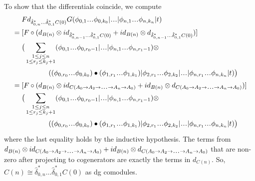 \begin{eg}
To show that the differentials coincide, 
we compute 
\begin{align*}
& \phantom{{}={}}
Fd_{\hat{\delta}_{0,n}^*\dots\hat{\delta}_{0,1}^*C(0)}G
  (\phi_{0,1} \smdots \phi_{0,k_0} | \smdots |
  \phi_{n,1} \smdots \phi_{n,k_n} | t) \\
&=
[F \circ (d_{B(n)}\otimes 
  id_{\hat{\delta}_{0,n-1}^*\dots\hat{\delta}_{0,1}^*C(0)} + 
  id_{B(n)} \otimes 
  d_{\hat{\delta}_{0,n-1}^*\dots\hat{\delta}_{0,1}^*C(0)})] \\
& \phantom{{}=  {}}
\big( \sum \limits_{\substack{1 \leq j \leq n\\
  1 \leq r_j \leq k_j+1}}
  (\phi_{0,1} \smdots \phi_{0,r_0-1} | \smdots |
  \phi_{n,1} \smdots \phi_{n,r_1-1} ) \otimes \\
&\phantom{{}= \big( \sum \sum {}}
  ((\phi_{0,r_0}\smdots \phi_{0,k_0}) \bullet 
  (\phi_{1,r_1}\smdots \phi_{1,k_1}) |
  \phi_{2,r_1}\smdots \phi_{2,k_2} | \smdots |
  \phi_{n,r_1}\smdots \phi_{n,k_n} | t) \big) \\
&=
[F \circ (d_{B(n)}\otimes 
  id_{C(A_0 \to A_2 \to \smdots \to A_n \to A_0)} + 
  id_{B(n)} \otimes 
  d_{C(A_0 \to A_2 \to \smdots \to A_n \to A_0)})] \\
& \phantom{{}=  {}}
\big( \sum \limits_{\substack{1 \leq j \leq n\\
  1 \leq r_j \leq k_j+1}}
  (\phi_{0,1} \smdots \phi_{0,r_0-1} | \smdots |
  \phi_{n,1} \smdots \phi_{n,r_1-1}) \otimes \\
&\phantom{{}= \big( \sum \sum {}}
  ((\phi_{0,r_0}\smdots \phi_{0,k_0}) \bullet 
  (\phi_{1,r_1}\smdots \phi_{1,k_1}) |
  \phi_{2,r_1}\smdots \phi_{2,k_2} | \smdots |
  \phi_{n,r_1}\smdots \phi_{n,k_n} | t) \big)
\end{align*}
where the last equality holds by the 
inductive hypothesis. The terms from 
$\newline 
d_{B(n)}\otimes id_{C(A_0 \to A_2 \to 
\smdots \to A_n \to A_0)} + 
id_{B(n)} \otimes d_{C(A_0 \to A_2 \to 
\smdots \to A_n \to A_0)}$ that
are non-zero after projecting to cogenerators 
are exactly the terms in $d_{C(n)}$. 
So, $C(n) \cong \hat{\delta}_{0,n}^*\dots
\hat{\delta}_{0,1}^*C(0)$ as dg comodules. 
\end{eg}
%
